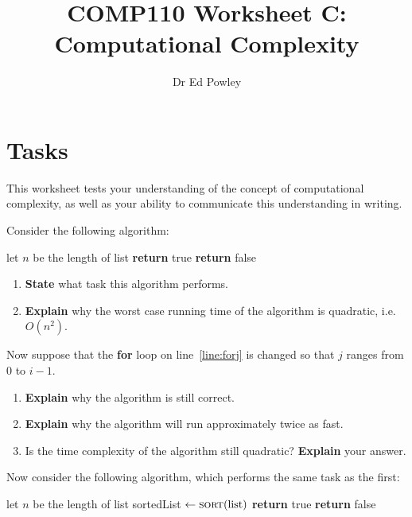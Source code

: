 \documentclass{../../../fal_assignment}
\title{COMP110 Worksheet C: Computational Complexity}
\author{Dr Ed Powley}
\begin{document}
\maketitle
{}

\section*{Tasks}

This worksheet tests your understanding of the concept of computational complexity,
as well as your ability to communicate this understanding in writing.

Consider the following algorithm:

\begin{algorithmic}[1]
		\State let $n$ be the length of list
			 \label{line:forj}
					\State \textbf{return} true
				\EndIf
			\EndFor
		\EndFor
		\State \textbf{return} false
	\EndProcedure
\end{algorithmic}

\begin{enumerate}[label=(\alph*)]
	\item\label{q:first} \textbf{State} what task this algorithm performs.
	\item \textbf{Explain} why the worst case running time of the algorithm is quadratic, i.e.\ $O(n^2)$.
\end{enumerate}

Now suppose that the \textbf{for} loop on line~\ref{line:forj} is changed so that $j$ ranges from $0$ to $i-1$.

\begin{enumerate}[resume,label=(\alph*)]
	\item \textbf{Explain} why the algorithm is still correct.
	\item \textbf{Explain} why the algorithm will run approximately twice as fast.
	\item Is the time complexity of the algorithm still quadratic? \textbf{Explain} your answer.
\end{enumerate}

Now consider the following algorithm, which performs the same task as the first:

\begin{algorithmic}[1]
		\State let $n$ be the length of list
		\State sortedList $\gets \Call{sort}{\text{list}}$
				\State \textbf{return} true
			\EndIf
		\EndFor
		\State \textbf{return} false
	\EndProcedure
\end{algorithmic}
\end{document}
